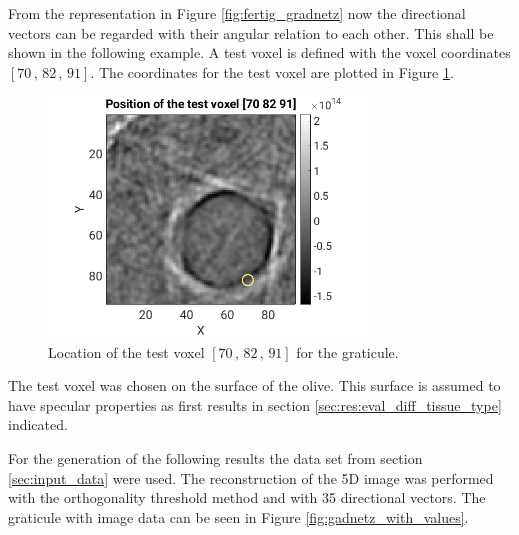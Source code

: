 From the representation in Figure \ref{fig:fertig_gradnetz} now the directional vectors can be regarded with their angular relation to each other. This shall be shown in the following example. A test voxel is defined with the voxel coordinates $[70\, , \, 82\, , \, 91]$. The coordinates for the test voxel are plotted in Figure \ref{fig:gadnetz_location_testvoxel}.

\begin{figure}[H]
    \centering
    \includegraphics[width=0.76\textwidth]{Graphics/Results/gradnetz/positionof_test_voxel_for-gradnetz.png}
    \caption{Location of the test voxel $[70\, , \, 82\, , \, 91]$ for the graticule. }
    \label{fig:gadnetz_location_testvoxel}
\end{figure}

The test voxel was chosen on the surface of the olive. This surface is assumed to have specular properties as first results in section \ref{sec:res:eval_diff_tissue_type} indicated. 

\bigskip

For the generation of the following results the data set from section \ref{sec:input_data} were used. The reconstruction of the 5D image was performed with the orthogonality threshold method and with 35 directional vectors. The graticule with image data can be seen in Figure \ref{fig:gadnetz_with_values}.



